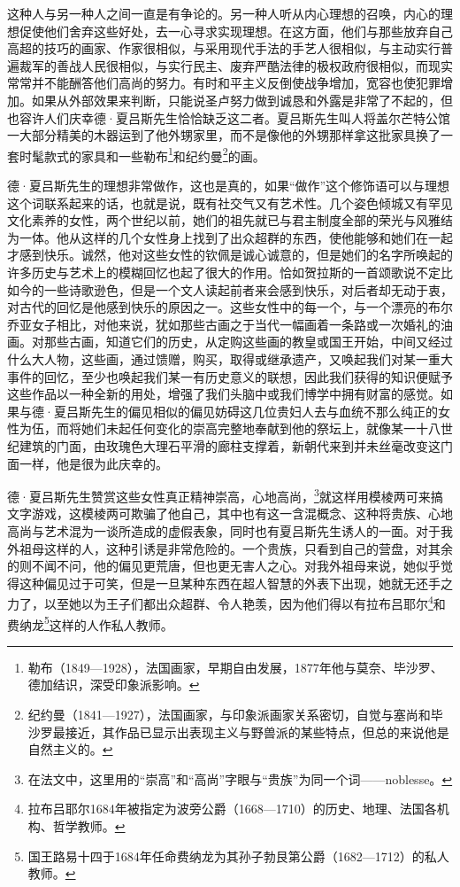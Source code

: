 \par 这种人与另一种人之间一直是有争论的。另一种人听从内心理想的召唤，内心的理想促使他们舍弃这些好处，去一心寻求实现理想。在这方面，他们与那些放弃自己高超的技巧的画家、作家很相似，与采用现代手法的手艺人很相似，与主动实行普遍裁军的善战人民很相似，与实行民主、废弃严酷法律的极权政府很相似，而现实常常并不能酬答他们高尚的努力。有时和平主义反倒使战争增加，宽容也使犯罪增加。如果从外部效果来判断，只能说圣卢努力做到诚恳和外露是非常了不起的，但也容许人们庆幸德·夏吕斯先生恰恰缺乏这二者。夏吕斯先生叫人将盖尔芒特公馆一大部分精美的木器运到了他外甥家里，而不是像他的外甥那样拿这批家具换了一套时髦款式的家具和一些勒布\footnote{勒布（1849—1928），法国画家，早期自由发展，1877年他与莫奈、毕沙罗、德加结识，深受印象派影响。}和纪约曼\footnote{纪约曼（1841—1927），法国画家，与印象派画家关系密切，自觉与塞尚和毕沙罗最接近，其作品已显示出表现主义与野兽派的某些特点，但总的来说他是自然主义的。}的画。
\par 德·夏吕斯先生的理想非常做作，这也是真的，如果“做作”这个修饰语可以与理想这个词联系起来的话，也就是说，既有社交气又有艺术性。几个姿色倾城又有罕见文化素养的女性，两个世纪以前，她们的祖先就已与君主制度全部的荣光与风雅结为一体。他从这样的几个女性身上找到了出众超群的东西，使他能够和她们在一起才感到快乐。诚然，他对这些女性的钦佩是诚心诚意的，但是她们的名字所唤起的许多历史与艺术上的模糊回忆也起了很大的作用。恰如贺拉斯的一首颂歌说不定比如今的一些诗歌逊色，但是一个文人读起前者来会感到快乐，对后者却无动于衷，对古代的回忆是他感到快乐的原因之一。这些女性中的每一个，与一个漂亮的布尔乔亚女子相比，对他来说，犹如那些古画之于当代一幅画着一条路或一次婚礼的油画。对那些古画，知道它们的历史，从定购这些画的教皇或国王开始，中间又经过什么大人物，这些画，通过馈赠，购买，取得或继承遗产，又唤起我们对某一重大事件的回忆，至少也唤起我们某一有历史意义的联想，因此我们获得的知识便赋予这些作品以一种全新的用处，增强了我们头脑中或我们博学中拥有财富的感觉。如果与德·夏吕斯先生的偏见相似的偏见妨碍这几位贵妇人去与血统不那么纯正的女性为伍，而将她们未起任何变化的崇高完整地奉献到他的祭坛上，就像某一十八世纪建筑的门面，由玫瑰色大理石平滑的廊柱支撑着，新朝代来到并未丝毫改变这门面一样，他是很为此庆幸的。
\par 德·夏吕斯先生赞赏这些女性真正精神崇高，心地高尚，\footnote{在法文中，这里用的“崇高”和“高尚”字眼与“贵族”为同一个词——noblesse。}就这样用模棱两可来搞文字游戏，这模棱两可欺骗了他自己，其中也有这一含混概念、这种将贵族、心地高尚与艺术混为一谈所造成的虚假表象，同时也有夏吕斯先生诱人的一面。对于我外祖母这样的人，这种引诱是非常危险的。一个贵族，只看到自己的营盘，对其余的则不闻不问，他的偏见更荒唐，但也更无害人之心。对我外祖母来说，她似乎觉得这种偏见过于可笑，但是一旦某种东西在超人智慧的外表下出现，她就无还手之力了，以至她以为王子们都出众超群、令人艳羡，因为他们得以有拉布吕耶尔\footnote{拉布吕耶尔1684年被指定为波旁公爵（1668—1710）的历史、地理、法国各机构、哲学教师。}和费纳龙\footnote{国王路易十四于1684年任命费纳龙为其孙子勃艮第公爵（1682—1712）的私人教师。}这样的人作私人教师。
